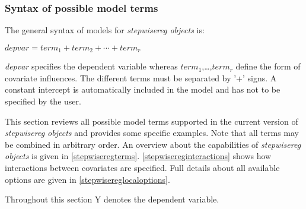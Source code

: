 \subsubsection{Syntax of possible model terms}
\label{stepwiseregmodelsyntax}

The general syntax of models for {\em stepwisereg objects} is:

$depvar = term_1 + term_2 + \cdots + term_r$

{\em depvar} specifies the dependent variable whereas
$term_1$,\dots,$term_r$ define the form of covariate influences. The
different terms must be separated by '+' signs. A constant intercept
is automatically included in the model and has not to be
specified by the user.

This section reviews all possible model terms supported in the
current version of {\em stepwisereg objects} and provides some specific
examples. Note that all terms may be combined in arbitrary
order. An overview about the capabilities of {\em stepwisereg objects}
is given in \autoref{stepwiseregterms}. \autoref{stepwisereginteractions}
shows how interactions between covariates are specified. Full
details about all available options are given in
\autoref{stepwisereglocaloptions}.

Throughout this section Y denotes the dependent variable.


